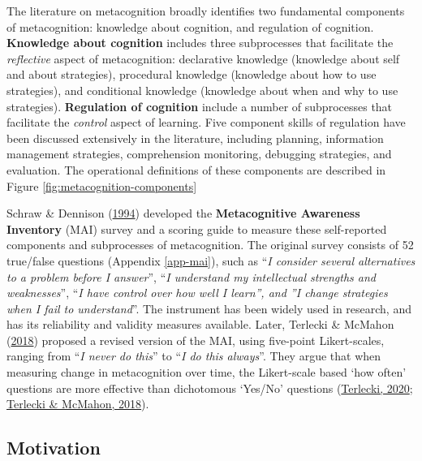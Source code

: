 \documentclass[letterpaper, nobind]{templates/ociamthesis}
\begin{document}
The literature on metacognition broadly identifies two fundamental
components of metacognition: knowledge about cognition, and regulation
of cognition. \textbf{Knowledge about cognition} includes three subprocesses
that facilitate the \emph{reflective} aspect of metacognition: declarative
knowledge (knowledge about self and about strategies), procedural
knowledge (knowledge about how to use strategies), and conditional
knowledge (knowledge about when and why to use strategies). \textbf{Regulation
of cognition} include a number of subprocesses that facilitate the
\emph{control} aspect of learning. Five component skills of regulation have
been discussed extensively in the literature, including planning,
information management strategies, comprehension monitoring, debugging
strategies, and evaluation. The operational definitions of these
components are described in Figure \ref{fig:metacognition-components}

Schraw \& Dennison (\protect\hyperlink{ref-schraw1994assessing}{1994}) developed the \textbf{Metacognitive Awareness Inventory} (MAI) survey and a
scoring guide to measure these self-reported components and subprocesses
of metacognition. The original survey consists of 52 true/false
questions (Appendix \ref{app-mai}), such as ``\emph{I consider several alternatives to a problem before I answer}'', ``\emph{I understand my intellectual strengths and weaknesses}'', ``\emph{I have control over how well I learn'', and ''I change strategies when I fail to understand}''.
The instrument has been widely used in research, and has its reliability and validity measures available. Later, Terlecki \& McMahon (\protect\hyperlink{ref-terlecki2018call}{2018}) proposed a revised version of the MAI, using five-point Likert-scales, ranging from ``\emph{I never do this}'' to ``\emph{I do this always}''.
They argue that when measuring change in metacognition over time, the Likert-scale based `how often' questions are more effective than dichotomous `Yes/No' questions (\protect\hyperlink{ref-terlecki2020revising}{Terlecki, 2020}; \protect\hyperlink{ref-terlecki2018call}{Terlecki \& McMahon, 2018}).

\hypertarget{motivation}{%
\subsection{Motivation}\label{motivation}}
\end{document}
